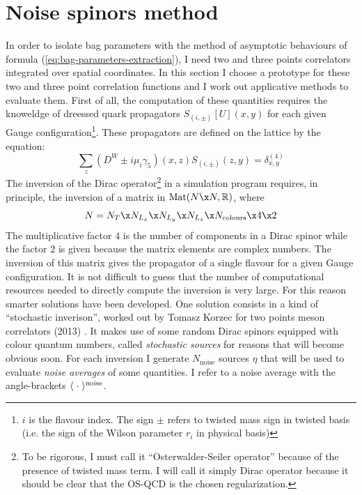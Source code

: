 \documentclass[english, LaM, oneside, noexaminfo]{sapthesis}
\begin{document}
\section{Noise spinors method}
\noindent
In order to isolate bag parameters with the method of asymptotic behaviours of formula (\ref{eq:bag-parameters-extraction}), I need two and three points correlators integrated over spatial coordinates.
In this section I choose a prototype for these two and three point correlation functions and I work out applicative methods to evaluate them.
\newline
First of all, the computation of these quantities requires the knoweldge of dreessed quark propagators $S_{(i,\pm)}[U](x,y)$ for each given Gauge configuration\footnote{$i$ is the flavour index. The sign $\pm$ refers to twisted mass sign in twisted basis (i.e. the sign of the Wilson parameter $r_i$ in physical basis)}.
These propagators are defined on the lattice by the equation:
\begin{equation*}
    \sum_{z} \left(D^W\pm i\mu_i \gamma_5\right)(x,z) S_{(i,\pm)}(z,y) = \delta_{x,y}^{(4)}
\end{equation*}
The inversion of the Dirac operator\footnote{To be rigorous, I must call it ``Osterwalder-Seiler operator'' because of the presence of twisted mass term. I will call it simply Dirac operator because it should be clear that the OS-QCD is the chosen regularization.}
in a simulation program requires, in principle, the inversion of a matrix in $\text{Mat}(N\x N,\mathbb{R})$, where
$$N = N_T \x N_{L_x} \x N_{L_y} \x N_{L_z} \x N_\text{colours} \x 4 \x 2 $$
The multiplicative factor $4$ is the number of components in a Dirac spinor while the factor $2$ is given because the matrix elements are complex numbers.
The inversion of this matrix gives the propagator of a single flavour for a given Gauge configuration.
It is not difficult to guess that the number of computational resources needed to directly compute the inversion is very large.
For this reason smarter solutions have been developed.
\newline
One solution consists in a kind of ``stochastic inverison'', worked out by Tomasz Korzec for two points meson correlators (2013) \cite{korzec}.
It makes use of some random Dirac spinors equipped with colour quantum numbers, called \textit{stochastic sources} for reasons that will become obvious soon.
For each inversion I generate $N_\text{noise}$ sources $\eta$ that will be used to evaluate \textit{noise averages} of some quantities.
I refer to a noise average with the angle-brackets $\langle\hspace{1mm}\cdot\hspace{1mm}\rangle^\text{noise}$. 
\end{document}

